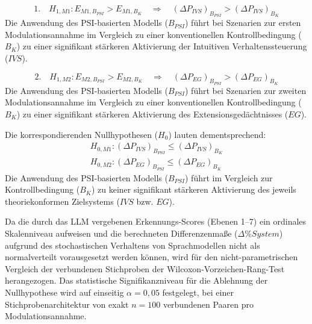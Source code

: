\begin{equation}
   \text{1.} \quad H_{1, M1}: E_{M1, B_{PSI}} > E_{M1, B_{K}} \quad \Longrightarrow \quad (\Delta P_{IVS})_{B_{PSI}} > (\Delta P_{IVS})_{B_{K}}
\end{equation}
Die Anwendung des PSI-basierten Modells ($B_{PSI}$) führt bei Szenarien zur ersten Modulationsannahme im Vergleich zu einer konventionellen Kontrollbedingung ($B_{K}$) zu einer signifikant stärkeren Aktivierung der Intuitiven Verhaltenssteuerung ($IVS$).


\begin{equation}
   \text{2.} \quad H_{1, M2}: E_{M2, B_{PSI}} > E_{M2, B_{K}} \quad \Longrightarrow \quad (\Delta P_{EG})_{B_{PSI}} > (\Delta P_{EG})_{B_{K}}
\end{equation}
Die Anwendung des PSI-basierten Modells ($B_{PSI}$) führt bei Szenarien zur zweiten Modulationsannahme im Vergleich zu einer konventionellen Kontrollbedingung ($B_{K}$) zu einer signifikant stärkeren Aktivierung des Extensionsgedächtnisses ($EG$).

Die korrespondierenden Nullhypothesen ($H_0$) lauten dementsprechend:
\begin{align}
    H_{0, M1}: (\Delta P_{IVS})_{B_{PSI}} \le (\Delta P_{IVS})_{B_{K}} \\
    H_{0, M2}: (\Delta P_{EG})_{B_{PSI}} \le (\Delta P_{EG})_{B_{K}}
\end{align}
Die Anwendung des PSI-basierten Modells ($B_{PSI}$) führt im Vergleich zur Kontrollbedingung ($B_{K}$) zu keiner signifikant stärkeren Aktivierung des jeweils theoriekonformen Zielsystems ($IVS$ bzw. $EG$).

Da die durch das LLM vergebenen Erkennungs-Scores (Ebenen 1--7) ein ordinales Skalenniveau aufweisen und die berechneten Differenzenmaße ($\Delta\%System$) aufgrund des stochastischen Verhaltens von Sprachmodellen nicht als normalverteilt vorausgesetzt werden können, wird für den nicht-parametrischen Vergleich der verbundenen Stichproben der Wilcoxon-Vorzeichen-Rang-Test herangezogen. Das statistische Signifikanzniveau für die Ablehnung der Nullhypothese wird auf einseitig $\alpha = 0{,}05$ festgelegt, bei einer Stichprobenarchitektur von exakt $n = 100$ verbundenen Paaren pro Modulationsannahme.

